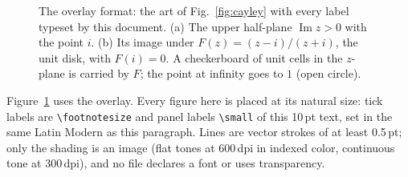 \documentclass[aps,prl,twocolumn,10pt,nofootinbib]{revtex4-2}
\begin{document}
\begin{figure}[tbp]
  \centering
  
  \caption{The overlay format: the art of Fig.~\ref{fig:cayley} with every label typeset by this document. (a) The upper half-plane $\operatorname{Im} z>0$ with the point $i$. (b) Its image under $F(z)=(z-i)/(z+i)$, the unit disk, with $F(i)=0$. A checkerboard of unit cells in the $z$-plane is carried by $F$; the point at infinity goes to $1$ (open circle).}
  \label{fig:overlay}
\end{figure}
Figure~\ref{fig:overlay} uses the overlay. Every figure here is placed at its natural size: tick labels are \verb|\footnotesize| and panel labels \verb|\small| of this 10\,pt text, set in the same Latin Modern as this paragraph. Lines are vector strokes of at least 0.5\,pt; only the shading is an image (flat tones at 600\,dpi in indexed color, continuous tone at 300\,dpi), and no file declares a font or uses transparency.
\end{document}
